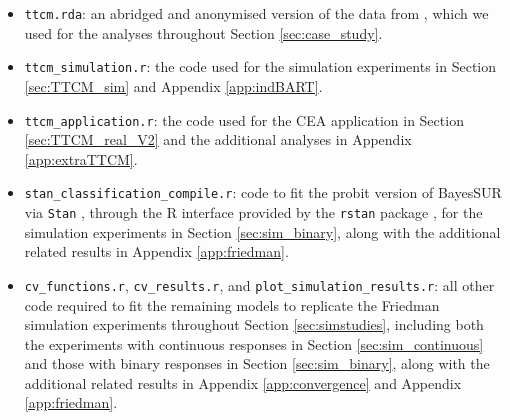 \documentclass[aoas,preprint]{imsart}
\theoremstyle{plain}
\theoremstyle{definition}
\theoremstyle{remark}
\begin{document}
\begin{appendix}
\begin{itemize}[wide]
    \item \texttt{ttcm.rda}: an abridged and anonymised version of the data from \citet{wiertsema2019cost}, which we used for the analyses throughout Section \ref{sec:case_study}.
    \item \texttt{ttcm\_simulation.r}: the code used for the simulation experiments in Section \ref{sec:TTCM_sim} and Appendix \ref{app:indBART}.
    \item \texttt{ttcm\_application.r}: the code used for the CEA application in Section \ref{sec:TTCM_real_V2} and the additional analyses in Appendix \ref{app:extraTTCM}.
    \item \texttt{stan\_classification\_compile.r}: code to fit the probit version of BayesSUR via \texttt{Stan} \citep{stanusersguide}, through the \textsf{R} interface provided by the \texttt{rstan} package \citep{rstanref}, for the simulation experiments in Section \ref{sec:sim_binary}, along with the additional related results in Appendix \ref{app:friedman}.
    \item \texttt{cv\_functions.r}, \texttt{cv\_results.r}, and \texttt{plot\_simulation\_results.r}: all other code required to fit the remaining models to replicate the Friedman simulation experiments throughout Section \ref{sec:simstudies}, including both the experiments with continuous responses in Section \ref{sec:sim_continuous} and those with binary responses in Section \ref{sec:sim_binary}, along with the additional related results in Appendix \ref{app:convergence} and Appendix \ref{app:friedman}.
\end{itemize}

\end{appendix}

{}


\end{document}
